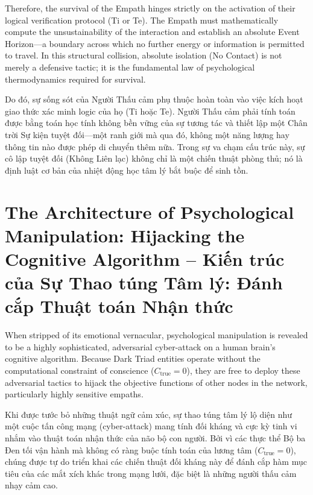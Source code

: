 \documentclass{report}
\begin{document}
Therefore, the survival of the Empath hinges strictly on the activation of their logical verification protocol (Ti or Te). The Empath must mathematically compute the unsustainability of the interaction and establish an absolute Event Horizon—a boundary across which no further energy or information is permitted to travel. In this structural collision, absolute isolation (No Contact) is not merely a defensive tactic; it is the fundamental law of psychological thermodynamics required for survival.

Do đó, sự sống sót của Người Thấu cảm phụ thuộc hoàn toàn vào việc kích hoạt giao thức xác minh logic của họ (Ti hoặc Te). Người Thấu cảm phải tính toán được bằng toán học tính không bền vững của sự tương tác và thiết lập một Chân trời Sự kiện tuyệt đối—một ranh giới mà qua đó, không một năng lượng hay thông tin nào được phép di chuyển thêm nữa. Trong sự va chạm cấu trúc này, sự cô lập tuyệt đối (Không Liên lạc) không chỉ là một chiến thuật phòng thủ; nó là định luật cơ bản của nhiệt động học tâm lý bắt buộc để sinh tồn.


\chapter{The Architecture of Psychological Manipulation: Hijacking the Cognitive Algorithm -- Kiến trúc của Sự Thao túng Tâm lý: Đánh cắp Thuật toán Nhận thức}

When stripped of its emotional vernacular, psychological manipulation is revealed to be a highly sophisticated, adversarial cyber-attack on a human brain's cognitive algorithm. Because Dark Triad entities operate without the computational constraint of conscience ($C_{\text{true}} = 0$), they are free to deploy these adversarial tactics to hijack the objective functions of other nodes in the network, particularly highly sensitive empaths.

Khi được tước bỏ những thuật ngữ cảm xúc, sự thao túng tâm lý lộ diện như một cuộc tấn công mạng (cyber-attack) mang tính đối kháng và cực kỳ tinh vi nhắm vào thuật toán nhận thức của não bộ con người. Bởi vì các thực thể Bộ ba Đen tối vận hành mà không có ràng buộc tính toán của lương tâm ($C_{\text{true}} = 0$), chúng được tự do triển khai các chiến thuật đối kháng này để đánh cắp hàm mục tiêu của các mắt xích khác trong mạng lưới, đặc biệt là những người thấu cảm nhạy cảm cao.
\end{document}
